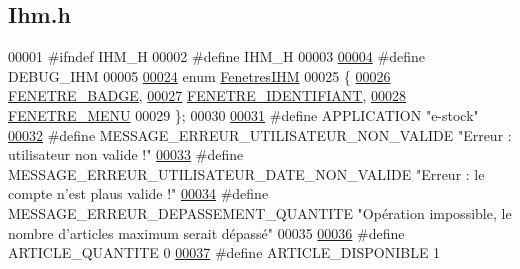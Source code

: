 \hypertarget{_ihm_8h_source}{}\subsection{Ihm.\+h}
\label{_ihm_8h_source}

\begin{DoxyCode}
00001 \textcolor{preprocessor}{#ifndef IHM\_H}
00002 \textcolor{preprocessor}{#define IHM\_H}
00003 
\hyperlink{_ihm_8h_a32b8776aca48b06a1716942899916d16}{00004} \textcolor{preprocessor}{#define DEBUG\_IHM}
00005 
\hyperlink{_ihm_8h_a280ed5a4ea1cf0cd4c224443fa33db12}{00024} \textcolor{keyword}{enum} \hyperlink{_ihm_8h_a280ed5a4ea1cf0cd4c224443fa33db12}{FenetresIHM}
00025 \{
\hyperlink{_ihm_8h_a280ed5a4ea1cf0cd4c224443fa33db12a1f316de8685375f757a120ce0fde7af2}{00026}     \hyperlink{_ihm_8h_a280ed5a4ea1cf0cd4c224443fa33db12a1f316de8685375f757a120ce0fde7af2}{FENETRE\_BADGE},       
\hyperlink{_ihm_8h_a280ed5a4ea1cf0cd4c224443fa33db12ab4af46727ba2f30a07d0dbf72fe1c6f5}{00027}     \hyperlink{_ihm_8h_a280ed5a4ea1cf0cd4c224443fa33db12ab4af46727ba2f30a07d0dbf72fe1c6f5}{FENETRE\_IDENTIFIANT}, 
\hyperlink{_ihm_8h_a280ed5a4ea1cf0cd4c224443fa33db12aab522f0c9f0507be961991070788221f}{00028}     \hyperlink{_ihm_8h_a280ed5a4ea1cf0cd4c224443fa33db12aab522f0c9f0507be961991070788221f}{FENETRE\_MENU}         
00029 \};
00030 
\hyperlink{_ihm_8h_a796bd7c6ba2e59281760fb155c6287e8}{00031} \textcolor{preprocessor}{#define APPLICATION "e-stock"}
\hyperlink{_ihm_8h_ac7f9ed2a1a76baab688e98e093b5d8fd}{00032} \textcolor{preprocessor}{#define MESSAGE\_ERREUR\_UTILISATEUR\_NON\_VALIDE "Erreur : utilisateur non valide !"}
\hyperlink{_ihm_8h_a65a121daaef1677092ae2f6fa3392a10}{00033} \textcolor{preprocessor}{#define MESSAGE\_ERREUR\_UTILISATEUR\_DATE\_NON\_VALIDE "Erreur : le compte n'est plaus valide !"}
\hyperlink{_ihm_8h_a6f69dbaa1a7d36f46cb64b31933b0251}{00034} \textcolor{preprocessor}{#define MESSAGE\_ERREUR\_DEPASSEMENT\_QUANTITE "Opération impossible, le nombre d'articles maximum serait
       dépassé"}
00035 
\hyperlink{_ihm_8h_ac91f014239536b9bb49d4265ca91d0d5}{00036} \textcolor{preprocessor}{#define ARTICLE\_QUANTITE 0}
\hyperlink{_ihm_8h_a2c5f129a41ff7dac8fa0d97af2d1efd5}{00037} \textcolor{preprocessor}{#define ARTICLE\_DISPONIBLE 1}

\end{DoxyCode}
